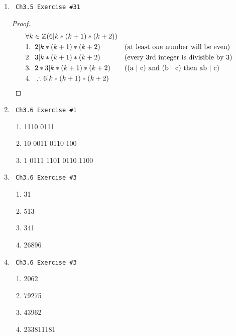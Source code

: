 \documentclass[12pt]{article}
\begin{document}
\begin{enumerate}
\begin{enumerate}[label=\alph*]
        \end{enumerate}
    
    \newpage

    \item \begin{verbatim} Ch3.5 Exercise #31 \end{verbatim}
        \begin{proof}
            \begin{align*}
                & \forall k \in \mathbb{Z}(6 | k*(k+1)*(k+2)) \\
                & 1.\;\; 2 | k*(k+1)*(k+2) && \text{(at least one number will be even)} \\
                & 2.\;\; 3 | k*(k+1)*(k+2) && \text{(every 3rd integer is divisible by 3)} \\
                & 3.\;\; 2 * 3 | k*(k+1)*(k+2) && \text{((a $|$ c) and (b $|$ c) then ab $|$ c)} \\
                & 4.\;\; \therefore 6 | k*(k+1)*(k+2) \qedhere
            \end{align*}
        \end{proof}
    
    \item \begin{verbatim} Ch3.6 Exercise #1 \end{verbatim}
        \begin{enumerate}[label=\alph*]
            \item 1110 0111
            \item 10 0011 0110 100
            \item 1 0111 1101 0110 1100
        \end{enumerate}

    \item \begin{verbatim} Ch3.6 Exercise #3 \end{verbatim}
        \begin{enumerate}[label=\alph*]
            \item 31
            \item 513
            \item 341
            \item 26896
        \end{enumerate}

    \item \begin{verbatim} Ch3.6 Exercise #3 \end{verbatim}
        \begin{enumerate}[label=\alph*]
            \item 2062
            \item 79275
            \item 43962
            \item 233811181
        \end{enumerate}


\end{enumerate}
\end{document}
